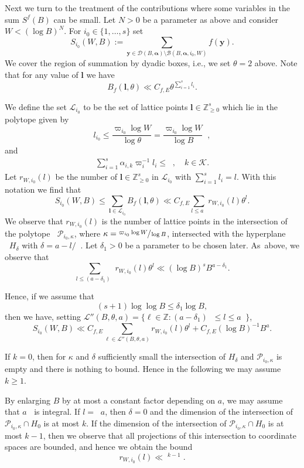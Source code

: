 \documentclass[11pt]{article}
\newcommand{\ie}{i.e.,\xspace}
\numberwithin{equation}{section}
\DeclareMathOperator{\LBt}{\mathit{L(B,\theta)}}
\newcommand{\cB}{\mathcal{B}}
\newcommand{\cD}{\mathcal{D}}
\newcommand{\cBalp}{\cD(B,\bfalp)}
\newcommand{\cBalpgen}[1]{\cB(B,\bfalp,#1)}
\newcommand{\cLBta}{\calL''(B,\theta,a)}
\let\del\delta
\let\tet\theta
\newcommand{\bfy}{\boldsymbol{y}}
\newcommand{\bfalp}{\boldsymbol{\alpha}}
\newcommand{\bfl}{\boldsymbol{l}}
\newcommand{\calK}{\mathcal{K}}
\newcommand{\calL}{\mathcal{L}}
\newcommand\ZZ{\mathbb{Z}}
\newcommand{\Z}{\mathbb{Z}}
\theoremstyle{definition}
\numberwithin{theorem}{section}
\begin{document}
Next we turn to the treatment of the contributions where some variables in the sum $S^f(B)$ can be small. Let $N>0$ be a parameter as above and consider $W< (\log B)^N$. For $i_0\in \{1,\ldots, s\}$ set
\[
S_{i_0}(W,B):= \sum_{\bfy\in\cBalp\setminus\cBalpgen{i_0,W}}f(\bfy).
\]
We cover the region of summation by dyadic boxes, \ie we set $\theta=2$ above. Note that for any value of $\bfl$ we have
\[
B_f(\bfl,\theta)\ll C_{f,E} \theta^{\sum_{i=1}^s l_i}.
\]

We define the set $\mathcal{L}_{i_0}$ to be the set of lattice points $\bfl\in\ZZ_{\geq 0}^s$ which lie in the polytope given by
\[
l_{i_0} \leq \frac{\varpi_{i_0} \log W}{\log \tet}= \frac{\varpi_{i_0}\log W}{\log B} \LBt,
\]
and
\begin{gather*}
\sum_{i=1}^s \alpha_{i,k} \varpi_i^{-1}l_i \leq \LBt,\quad k\in \calK.
\end{gather*}
Let $r_{W,i_0}(l)$ be the number of $\bfl\in \Z_{\geq 0}^s$ in $\mathcal{L}_{i_0}$ with $\sum_{i=1}^s l_i=l$. With this notation we find that
\[
S_{i_0}(W,B)\leq \sum_{\bfl\in \mathcal{L}_{i_0}}B_f(\bfl,\theta) \ll C_{f,E}\sum_{l\leq a \LBt} r_{W,i_0}(l) \theta^l.
\]
We observe that $r_{W,i_0}(l)$ is the number of lattice points in the intersection of the polytope $\LBt \mathcal{P}_{i_0,\kappa}$, where $\kappa= \sfrac{\varpi_{i_0}\log W}{\log B}$, intersected with the hyperplane $\LBt H_{\delta}$ with $\delta =a- l/{\LBt}$. Let $\del_1>0$ be a parameter to be chosen later. As~above, we observe that
\[
\sum_{l\leq (a-\del_1)\LBt} r_{W,i_0}(l) \theta^l \ll (\log B)^s B^{a-\del_1}.
\]

Hence, if we assume that
\begin{equation}\label{eqndel1}
(s+1) \log \log B \leq \del_1 \log B,
\end{equation}
then we have, setting $\cLBta=\{\ell\in\ZZ:(a-\del_1) \LBt \leq l\leq a \LBt\}$,
\[
S_{i_0}(W,B)\ll C_{f,E}\sum_{\ell\in\cLBta} r_{W,i_0}(l) \theta^l + C_{f,E} (\log B)^{-1} B^a.
\]

If $k=0$, then for $\kappa$ and $\delta$ sufficiently small the intersection of $H_\delta$ and $\mathcal{P}_{i_0,\kappa}$ is empty and there is nothing to bound. Hence in the following we may assume $k\geq 1$.\par
By enlarging $B$ by at most a constant factor depending on $a$, we may assume that $a\LBt$ is integral. If $l=\LBt a$, then $\del=0$ and the dimension of the intersection of $\mathcal{P}_{i_0,\kappa}\cap H_0$ is at most $k$. If the dimension of the intersection of $\mathcal{P}_{i_0,\kappa}\cap H_0$ is at most $k-1$, then we observe that all projections of this intersection to coordinate spaces are bounded, and hence we obtain the bound
\[
r_{W,i_0}(l)\ll \LBt^{k-1}.
\]
\end{document}
